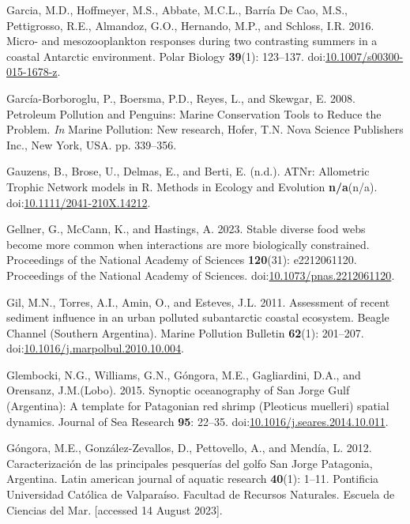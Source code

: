 \documentclass[
]{article}
\newlength{\cslhangindent}
\newenvironment{CSLReferences}[2] %
 {\begin{list}{}{%
  \setlength{\itemindent}{0pt}
  \setlength{\leftmargin}{0pt}
  \setlength{\parsep}{0pt}
  \ifodd #1
   \setlength{\leftmargin}{\cslhangindent}
   \setlength{\itemindent}{-1\cslhangindent}
  \fi
  \setlength{\itemsep}{#2\baselineskip}}}
 {\end{list}}
\begin{document}
\begin{CSLReferences}{1}{0}
Garcia, M.D., Hoffmeyer, M.S., Abbate, M.C.L., Barría De Cao, M.S.,
Pettigrosso, R.E., Almandoz, G.O., Hernando, M.P., and Schloss, I.R.
2016. Micro- and mesozooplankton responses during two contrasting
summers in a coastal {Antarctic} environment. Polar Biology
\textbf{39}(1): 123--137.
doi:\href{https://doi.org/10.1007/s00300-015-1678-z}{10.1007/s00300-015-1678-z}.

García-Borboroglu, P., Boersma, P.D., Reyes, L., and Skewgar, E. 2008.
Petroleum {Pollution} and {Penguins}: {Marine Conservation Tools} to
{Reduce} the {Problem}. \emph{In} Marine {Pollution}: {New} research,
Hofer, T.N. Nova Science Publishers Inc., New York, USA. pp. 339--356.

Gauzens, B., Brose, U., Delmas, E., and Berti, E. (n.d.). {ATNr}:
{Allometric Trophic Network} models in {R}. Methods in Ecology and
Evolution \textbf{n/a}(n/a).
doi:\href{https://doi.org/10.1111/2041-210X.14212}{10.1111/2041-210X.14212}.

Gellner, G., McCann, K., and Hastings, A. 2023. Stable diverse food webs
become more common when interactions are more biologically constrained.
Proceedings of the National Academy of Sciences \textbf{120}(31):
e2212061120. Proceedings of the National Academy of Sciences.
doi:\href{https://doi.org/10.1073/pnas.2212061120}{10.1073/pnas.2212061120}.

Gil, M.N., Torres, A.I., Amin, O., and Esteves, J.L. 2011. Assessment of
recent sediment influence in an urban polluted subantarctic coastal
ecosystem. {Beagle Channel} ({Southern Argentina}). Marine Pollution
Bulletin \textbf{62}(1): 201--207.
doi:\href{https://doi.org/10.1016/j.marpolbul.2010.10.004}{10.1016/j.marpolbul.2010.10.004}.

Glembocki, N.G., Williams, G.N., Góngora, M.E., Gagliardini, D.A., and
Orensanz, J.M.(Lobo). 2015. Synoptic oceanography of {San Jorge Gulf}
({Argentina}): {A} template for {Patagonian} red shrimp ({Pleoticus}
muelleri) spatial dynamics. Journal of Sea Research \textbf{95}: 22--35.
doi:\href{https://doi.org/10.1016/j.seares.2014.10.011}{10.1016/j.seares.2014.10.011}.

Góngora, M.E., González-Zevallos, D., Pettovello, A., and Mendía, L.
2012. Caracterizaci{ó}n de las principales pesquer{í}as del golfo {San
Jorge Patagonia}, {Argentina}. Latin american journal of aquatic
research \textbf{40}(1): 1--11. Pontificia Universidad Cat{ó}lica de
Valpara{í}so. Facultad de Recursos Naturales. Escuela de Ciencias del
Mar. {[}accessed 14 August 2023{]}.


\end{CSLReferences}
\end{document}
